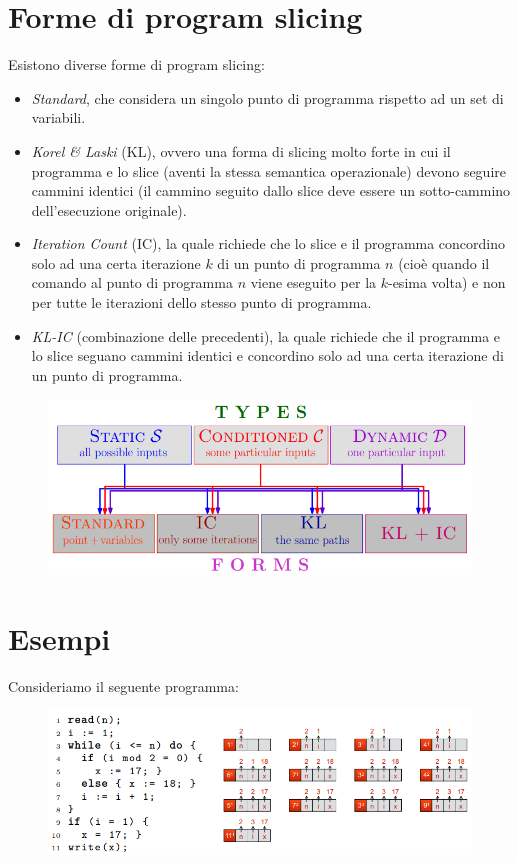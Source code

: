 \documentclass[a4paper,oneside,titlepage]{book}
\begin{document}
\section{Forme di program slicing}
Esistono diverse forme di program slicing:
\begin{itemize}
    \item \textit{Standard}, che considera un singolo punto di programma rispetto ad un set di variabili.
	\item \textit{Korel \& Laski} (KL), ovvero una forma di slicing molto forte in cui il programma e lo slice (aventi la stessa semantica operazionale) devono seguire cammini identici (il cammino seguito dallo slice deve essere un sotto-cammino dell'esecuzione originale).
	\item \textit{Iteration Count} (IC), la quale richiede che lo slice e il programma concordino solo ad una certa iterazione $k$ di un punto di programma $n$ (cioè quando il comando al punto di programma $n$ viene eseguito per la $k$-esima volta) e non per tutte le iterazioni dello stesso punto di programma.
	\item \textit{KL-IC} (combinazione delle precedenti), la quale richiede che il programma e lo slice seguano cammini identici e concordino solo ad una certa iterazione di un punto di programma.
\end{itemize}
\begin{figure}[htp]
	\centering
	\includegraphics[width=\textwidth, height=\textheight, keepaspectratio]{slicing2.png}
\end{figure}

\newpage
\section{Esempi}
Consideriamo il seguente programma:
\begin{figure}[htp]
	\centering
	\includegraphics[width=\textwidth, height=\textheight, keepaspectratio]{slicing3.png}
\end{figure}
\end{document}
